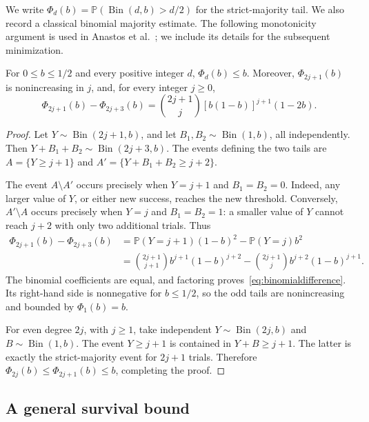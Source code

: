 \documentclass[10pt,a4paper]{article}
\DeclareMathOperator{\Bin}{Bin}
\newcommand{\Pp}{\mathbb P}
\begin{document}
We write \(\Phi_d(b)=\Pp(\Bin(d,b)>d/2)\) for the strict-majority tail. We also record a classical binomial majority estimate. The following monotonicity argument is used in Anastos et al.~\cite[Proposition~19]{ALSS}; we include its details for the subsequent minimization.
\begin{lemma}\label{lem:binomial}
For \(0\le b\le1/2\) and every positive integer \(d\),
\(\Phi_d(b)\le b\).
Moreover, \(\Phi_{2j+1}(b)\) is nonincreasing in \(j\), and, for every integer \(j\ge0\),
\begin{equation}\label{eq:binomialdifference}
\Phi_{2j+1}(b)-\Phi_{2j+3}(b)
=\binom{2j+1}{j}[b(1-b)]^{j+1}(1-2b).
\end{equation}
\end{lemma}
\begin{proof}
Let \(Y\sim\Bin(2j+1,b)\), and let \(B_1,B_2\sim\Bin(1,b)\), all independently. Then \(Y+B_1+B_2\sim\Bin(2j+3,b)\). The events defining the two tails are \(A=\{Y\ge j+1\}\) and \(A'=\{Y+B_1+B_2\ge j+2\}\).

The event \(A\setminus A'\) occurs precisely when \(Y=j+1\) and \(B_1=B_2=0\). Indeed, any larger value of \(Y\), or either new success, reaches the new threshold. Conversely, \(A'\setminus A\) occurs precisely when \(Y=j\) and \(B_1=B_2=1\): a smaller value of \(Y\) cannot reach \(j+2\) with only two additional trials. Thus
\[
\begin{aligned}
\Phi_{2j+1}(b)-\Phi_{2j+3}(b)
&=\Pp(Y=j+1)(1-b)^2-\Pp(Y=j)b^2\\
&=\binom{2j+1}{j+1}b^{j+1}(1-b)^{j+2}
-\binom{2j+1}{j}b^{j+2}(1-b)^{j+1}.
\end{aligned}
\]
The binomial coefficients are equal, and factoring proves~\eqref{eq:binomialdifference}. Its right-hand side is nonnegative for \(b\le1/2\), so the odd tails are nonincreasing and bounded by \(\Phi_1(b)=b\).

For even degree \(2j\), with \(j\ge1\), take independent \(Y\sim\Bin(2j,b)\) and \(B\sim\Bin(1,b)\). The event \(Y\ge j+1\) is contained in \(Y+B\ge j+1\). The latter is exactly the strict-majority event for \(2j+1\) trials. Therefore \(\Phi_{2j}(b)\le\Phi_{2j+1}(b)\le b\), completing the proof.
\end{proof}


\subsection{A general survival bound}\label{sec:selectedvertex}
\end{document}
